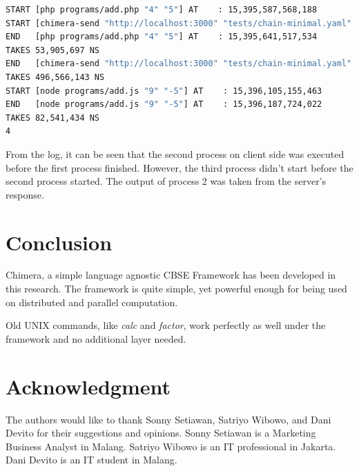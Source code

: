 \documentclass[conference]{IEEEtran}
\begin{document}
\begin{lstlisting}[caption=Client Log, label=clientLog, language=bash, basicstyle=\small, breaklines=true]
START [php programs/add.php "4" "5"] AT    : 15,395,587,568,188
START [chimera-send "http://localhost:3000" "tests/chain-minimal.yaml" "4" "5"] AT    : 15,395,607,233,624
END   [php programs/add.php "4" "5"] AT    : 15,395,641,517,534
TAKES 53,905,697 NS
END   [chimera-send "http://localhost:3000" "tests/chain-minimal.yaml" "4" "5"] AT    : 15,396,103,823,215
TAKES 496,566,143 NS
START [node programs/add.js "9" "-5"] AT    : 15,396,105,155,463
END   [node programs/add.js "9" "-5"] AT    : 15,396,187,724,022
TAKES 82,541,434 NS
4
\end{lstlisting}

From the log, it can be seen that the second process on client side was executed before the first process finished.
However, the third process didn't start before the second process started. The output of process 2  was taken from the
server's response.

\section{Conclusion}

Chimera, a simple language agnostic CBSE Framework has been developed in this research. The framework is quite simple, yet powerful enough for being used on distributed and parallel computation.

Old UNIX commands, like {\it calc} and {\it factor}, work perfectly as well under the framework and
no additional layer needed.


\section*{Acknowledgment}

The authors would like to thank Sonny Setiawan, Satriyo Wibowo, and Dani Devito for
their suggestions and opinions. Sonny Setiawan is a Marketing Business Analyst in Malang.
Satriyo Wibowo is an IT professional in Jakarta. Dani Devito is an IT student in Malang.

\ifCLASSOPTIONcaptionsoff
  \newpage
\fi




\end{document}
